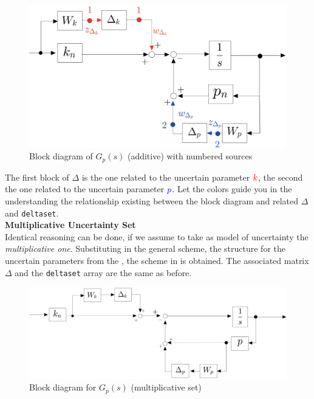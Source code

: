 \documentclass[a4paper, 12pt]{article}
\begin{document}
\begin{figure}[h]
    \centering
    \includegraphics[scale=0.23]{img/ex1_num.jpg}
    \caption{Block diagram of $G_p(s)$ (additive) with numbered sources}
    \label{fig:ex1_num}
\end{figure}


\noindent
The first block of $\Delta$ is the one related to the uncertain parameter $\color{red} k$, the second the one related to the uncertain parameter $\color{blue} p$. Let the colors guide you in the understanding the relationship existing between the block diagram and related $\Delta$ and \texttt{deltaset}.\\

\noindent
\textsf{\large \textbf{Multiplicative Uncertainty Set}}\\
Identical reasoning can be done, if we assume to take as model of uncertainty the \textit{multiplicative one}. Substituting in the general scheme, the structure for the uncertain parameters from the , the scheme in  is obtained. The associated matrix $\Delta$ and the \texttt{deltaset} array are the same as before.

\begin{figure}[h]
    \centering
    \includegraphics[scale=0.27]{img/ex1_mul.jpg}
    \caption{Block diagram for $G_p(s)$ (multiplicative set)}
    \label{fig:ex1_mul}
\end{figure}
\end{document}
